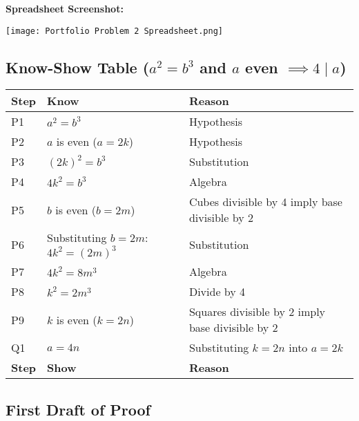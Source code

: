 \documentclass[12pt]{article}
\theoremstyle{definition}
\begin{document}
\textbf{Spreadsheet Screenshot:}
\begin{center}
    \texttt{[image: Portfolio Problem 2 Spreadsheet.png]}


\end{center}

\newpage

\subsection{Know-Show Table (\( a^2 = b^3 \) and \( a \) even \( \implies 4 \mid a \))}

\begin{center}
    \begin{tabular}{|p{}|p{}|p{}|}
    \hline
    \textbf{Step} & \textbf{Know} & \textbf{Reason} \\
    \hline
        P1 & \( a^2 = b^3 \) & Hypothesis \\
    \hline
        P2 & \( a \) is even (\( a = 2k \)) & Hypothesis \\
    \hline
        P3 & \( (2k)^2 = b^3 \) & Substitution \\
    \hline
        P4 & \( 4k^2 = b^3 \) & Algebra \\
    \hline
        P5 & \( b \) is even (\( b = 2m \)) & Cubes divisible by 4 imply base divisible by 2 \\
    \hline
        P6 & Substituting \( b = 2m \): \( 4k^2 = (2m)^3 \) & Substitution \\
    \hline
        P7 & \( 4k^2 = 8m^3 \) & Algebra \\
    \hline
        P8 & \( k^2 = 2m^3 \) & Divide by 4 \\
    \hline
        P9 & \( k \) is even (\( k = 2n \)) & Squares divisible by 2 imply base divisible by 2 \\
    \hline
        Q1 & \( a = 4n \) & Substituting \( k = 2n \) into \( a = 2k \) \\
    \hline
    \textbf{Step} & \textbf{Show} & \textbf{Reason} \\
    \hline
    \end{tabular}
\end{center}

\newpage

\subsection{First Draft of Proof}
\end{document}
